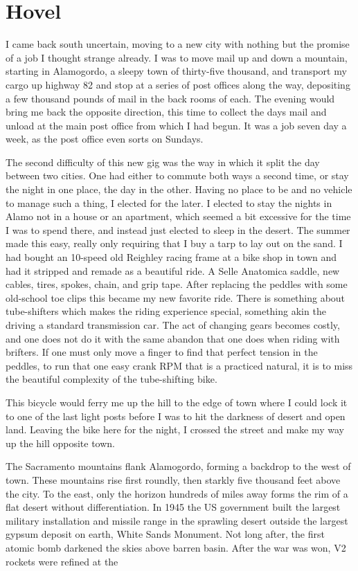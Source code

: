 \documentclass[ebook, 10pt, openright, onecolumn]{memoir}
\newlength{\drop}%
\begin{document}
\chapter{Hovel}
\label{cha:hovel}

I came back south uncertain, moving to a new city with nothing but the promise
of a job I thought strange already.  I was to move mail up and down a mountain,
starting in Alamogordo, a sleepy town of thirty-five thousand, and transport
my cargo up highway 82 and stop at a series of post offices along the way,
depositing a few thousand pounds of mail in the back rooms of each.  The evening
would bring me back the opposite direction, this time to collect the days mail
and unload at the main post office from which I had begun.  It was a job seven
day a week, as the post office even sorts on Sundays.

The second difficulty of this new gig was the way in which it split the day
between two cities.  One had either to commute both ways a second time, or stay
the night in one place, the day in the other.  Having no place to be and no
vehicle to manage such a thing, I elected for the later.  I elected to stay the
nights in Alamo not in a house or an apartment, which seemed a bit excessive for
the time I was to spend there, and instead just elected to sleep in the desert.
The summer made this easy, really only requiring that I buy a tarp to lay out on
the sand.  I had bought an 10-speed old Reighley racing frame at a bike shop in
town and had it stripped and remade as a beautiful ride.  A Selle Anatomica
saddle, new cables, tires, spokes, chain, and grip tape.  After replacing the
peddles with some old-school toe clips this became my new favorite ride.  There
is something about tube-shifters which makes the riding experience special,
something akin the driving a standard transmission car.  The act of changing
gears becomes costly, and one does not do it with the same abandon that one does
when riding with brifters.  If one must only move a finger to find that perfect
tension in the peddles, to run that one easy crank RPM that is a practiced
natural, it is to miss the beautiful complexity of the tube-shifting bike.

This bicycle would ferry me up the hill to the edge of town where I could lock
it to one of the last light posts before I was to hit the darkness of desert and
open land.  Leaving the bike here for the night, I crossed the street and
make my way up the hill opposite town.

The Sacramento mountains flank Alamogordo, forming a backdrop to the west of
town.  These mountains rise first roundly, then starkly five thousand feet above
the city.  To the east, only the horizon hundreds of miles away forms the rim of
a flat desert without differentiation.  In 1945 the US government built the
largest military installation and missile range in the sprawling desert outside
the largest gypsum deposit on earth, White Sands Monument.  Not long after,
the first atomic bomb darkened the skies above barren basin. After the war
was won, V2 rockets were refined at the
\end{document}
